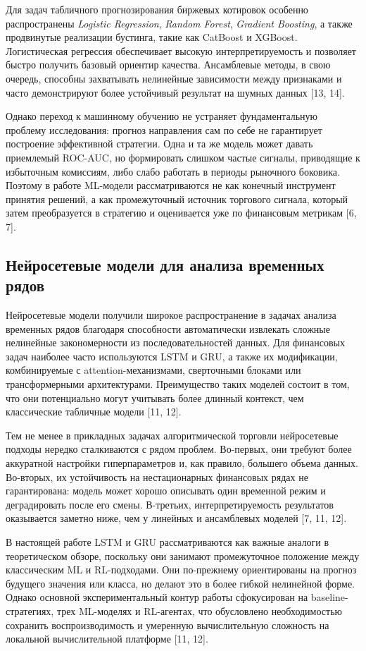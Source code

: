 Для задач табличного прогнозирования биржевых котировок особенно распространены \textit{Logistic Regression}, \textit{Random Forest}, \textit{Gradient Boosting}, а также продвинутые реализации бустинга, такие как CatBoost и XGBoost. Логистическая регрессия обеспечивает высокую интерпретируемость и позволяет быстро получить базовый ориентир качества. Ансамблевые методы, в свою очередь, способны захватывать нелинейные зависимости между признаками и часто демонстрируют более устойчивый результат на шумных данных [13, 14].

Однако переход к машинному обучению не устраняет фундаментальную проблему исследования: прогноз направления сам по себе не гарантирует построение эффективной стратегии. Одна и та же модель может давать приемлемый ROC-AUC, но формировать слишком частые сигналы, приводящие к избыточным комиссиям, либо слабо работать в периоды рыночного боковика. Поэтому в работе ML-модели рассматриваются не как конечный инструмент принятия решений, а как промежуточный источник торгового сигнала, который затем преобразуется в стратегию и оценивается уже по финансовым метрикам [6, 7].

\subsection{Нейросетевые модели для анализа временных рядов}

Нейросетевые модели получили широкое распространение в задачах анализа временных рядов благодаря способности автоматически извлекать сложные нелинейные закономерности из последовательностей данных. Для финансовых задач наиболее часто используются LSTM и GRU, а также их модификации, комбинируемые с attention-механизмами, сверточными блоками или трансформерными архитектурами. Преимущество таких моделей состоит в том, что они потенциально могут учитывать более длинный контекст, чем классические табличные модели [11, 12].

Тем не менее в прикладных задачах алгоритмической торговли нейросетевые подходы нередко сталкиваются с рядом проблем. Во-первых, они требуют более аккуратной настройки гиперпараметров и, как правило, большего объема данных. Во-вторых, их устойчивость на нестационарных финансовых рядах не гарантирована: модель может хорошо описывать один временной режим и деградировать после его смены. В-третьих, интерпретируемость результатов оказывается заметно ниже, чем у линейных и ансамблевых моделей [7, 11, 12].

В настоящей работе LSTM и GRU рассматриваются как важные аналоги в теоретическом обзоре, поскольку они занимают промежуточное положение между классическим ML и RL-подходами. Они по-прежнему ориентированы на прогноз будущего значения или класса, но делают это в более гибкой нелинейной форме. Однако основной экспериментальный контур работы сфокусирован на baseline-стратегиях, трех ML-моделях и RL-агентах, что обусловлено необходимостью сохранить воспроизводимость и умеренную вычислительную сложность на локальной вычислительной платформе [11, 12].

